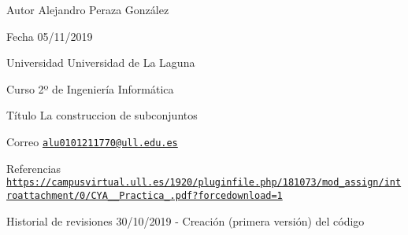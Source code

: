 \begin{DoxyAuthor}{Autor}
Alejandro Peraza González 
\end{DoxyAuthor}
\begin{DoxyDate}{Fecha}
05/11/2019 
\end{DoxyDate}
\begin{DoxyParagraph}{Universidad}
Universidad de La Laguna 
\end{DoxyParagraph}
\begin{DoxyParagraph}{Curso}
2º de Ingeniería Informática 
\end{DoxyParagraph}
\begin{DoxyParagraph}{Título}
La construccion de subconjuntos 
\end{DoxyParagraph}
\begin{DoxyParagraph}{Correo }
\href{mailto:alu0101211770@ull.edu.es}{\tt alu0101211770@ull.\+edu.\+es} 
\end{DoxyParagraph}
\begin{DoxyParagraph}{Referencias}
\href{https://campusvirtual.ull.es/1920/pluginfile.php/181073/mod_assign/introattachment/0/CYA_1920_Practica_7.pdf?forcedownload=1}{\tt https\+://campusvirtual.\+ull.\+es/1920/pluginfile.\+php/181073/mod\+\_\+assign/introattachment/0/\+C\+Y\+A\+\_\+\_\+\+Practica\+\_.\+pdf?forcedownload=1} 
\end{DoxyParagraph}
\begin{DoxyParagraph}{Historial de revisiones}
30/10/2019 -\/ Creación (primera versión) del código 
\end{DoxyParagraph}
